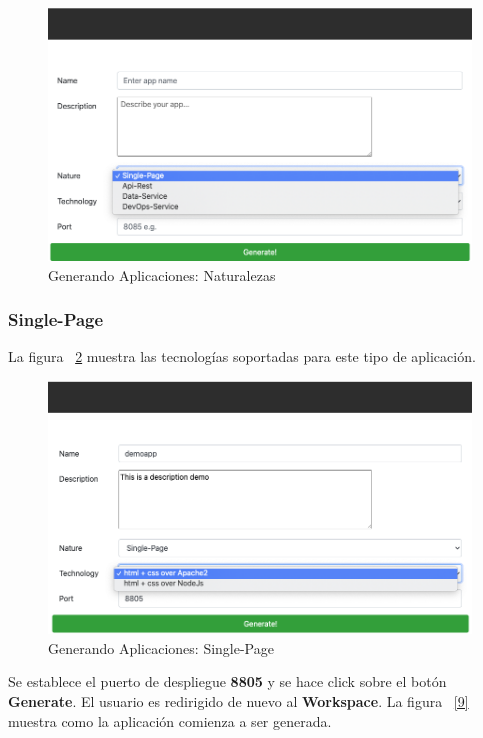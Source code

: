 \documentclass[a4paper,11pt]{book}
\begin{document}
\begin{figure}[H]
\centering
\includegraphics[scale=0.45]{imagenes/casouso_a/6.png}
\caption{  Generando Aplicaciones: Naturalezas  }
\label{6}
\end{figure}


\subsubsection{Single-Page}

La figura ~\ref{7} muestra las tecnologías soportadas para este tipo de aplicación.  

\begin{figure}[H]
\centering
\includegraphics[scale=0.45]{imagenes/casouso_a/7.png}
\caption{ Generando Aplicaciones: Single-Page   }
\label{7}
\end{figure}

Se establece el puerto de despliegue \textbf{8805} y se hace click sobre el botón \textbf{Generate}.
El usuario es redirigido de nuevo al \textbf{Workspace}. La figura   ~\ref{9} muestra como la aplicación comienza a ser generada. 
\end{document}
